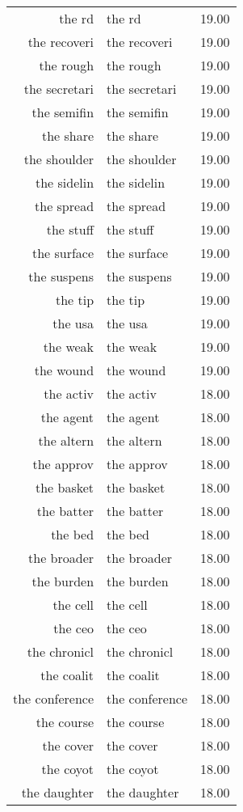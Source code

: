 \begin{table}[ht]
\begin{tabular}{rlr}
  the rd & the rd & 19.00 \\ 
  the recoveri & the recoveri & 19.00 \\ 
  the rough & the rough & 19.00 \\ 
  the secretari & the secretari & 19.00 \\ 
  the semifin & the semifin & 19.00 \\ 
  the share & the share & 19.00 \\ 
  the shoulder & the shoulder & 19.00 \\ 
  the sidelin & the sidelin & 19.00 \\ 
  the spread & the spread & 19.00 \\ 
  the stuff & the stuff & 19.00 \\ 
  the surface & the surface & 19.00 \\ 
  the suspens & the suspens & 19.00 \\ 
  the tip & the tip & 19.00 \\ 
  the usa & the usa & 19.00 \\ 
  the weak & the weak & 19.00 \\ 
  the wound & the wound & 19.00 \\ 
  the activ & the activ & 18.00 \\ 
  the agent & the agent & 18.00 \\ 
  the altern & the altern & 18.00 \\ 
  the approv & the approv & 18.00 \\ 
  the basket & the basket & 18.00 \\ 
  the batter & the batter & 18.00 \\ 
  the bed & the bed & 18.00 \\ 
  the broader & the broader & 18.00 \\ 
  the burden & the burden & 18.00 \\ 
  the cell & the cell & 18.00 \\ 
  the ceo & the ceo & 18.00 \\ 
  the chronicl & the chronicl & 18.00 \\ 
  the coalit & the coalit & 18.00 \\ 
  the conference & the conference & 18.00 \\ 
  the course & the course & 18.00 \\ 
  the cover & the cover & 18.00 \\ 
  the coyot & the coyot & 18.00 \\ 
  the daughter & the daughter & 18.00 \\ 

\end{tabular}
\end{table}
